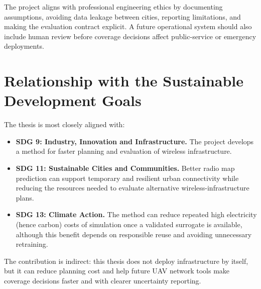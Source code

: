 The project aligns with professional engineering ethics by documenting
assumptions, avoiding data leakage between cities, reporting limitations, and
making the evaluation contract explicit. A future operational system should
also include human review before coverage decisions affect public-service or
emergency deployments.

\section{Relationship with the Sustainable Development Goals}

The thesis is most closely aligned with:

\begin{itemize}
  \item \textbf{SDG 9: Industry, Innovation and Infrastructure.} The project
  develops a method for faster planning and evaluation of wireless
  infrastructure.
  \item \textbf{SDG 11: Sustainable Cities and Communities.} Better radio map
  prediction can support temporary and resilient urban connectivity while
  reducing the resources needed to evaluate alternative wireless-infrastructure
  plans.
  \item \textbf{SDG 13: Climate Action.} The method can reduce repeated
  high electricity (hence carbon) costs of simulation once a validated surrogate is available, although this
  benefit depends on responsible reuse and avoiding unnecessary retraining.
\end{itemize}

The contribution is indirect: this thesis does not deploy infrastructure by
itself, but it can reduce planning cost and help future UAV network tools make
coverage decisions faster and with clearer uncertainty reporting.
